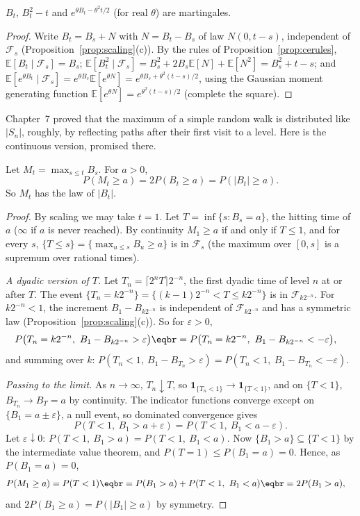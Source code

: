 \begin{proposition}\label{prop:bmmart}
$B_t$, $B_t^2-t$ and $e^{\theta B_t-\theta^2t/2}$ (for real $\theta$) are martingales.
\end{proposition}
\begin{proof}
Write $B_t=B_s+N$ with $N=B_t-B_s$ of law $N(0,t-s)$, independent of $\mathcal F_s$ (Proposition~\ref{prop:scaling}(c)). By the rules of Proposition~\ref{prop:cerules},
$\mathbb E[B_t\mid\mathcal F_s]=B_s$; $\mathbb E[B_t^2\mid\mathcal F_s]=B_s^2+2B_s\mathbb E[N]+\mathbb E[N^2]=B_s^2+t-s$; and $\mathbb E[e^{\theta B_t}\mid\mathcal F_s]=e^{\theta B_s}\mathbb E[e^{\theta N}]=e^{\theta B_s+\theta^2(t-s)/2}$, using the
Gaussian moment generating function $\mathbb E[e^{\theta N}]=e^{\theta^2(t-s)/2}$ (complete the square).
\end{proof}

Chapter~7 proved that the maximum of a simple random walk is distributed like $|S_n|$, roughly, by reflecting paths after
their first visit to a level. Here is the continuous version, promised there.

\begin{theorem}\label{thm:reflection}
Let $M_t=\max_{s\le t}B_s$. For $a>0$,
\[
P(M_t\ge a)=2P(B_t\ge a)=P(|B_t|\ge a).
\]
So $M_t$ has the law of $|B_t|$.
\end{theorem}
\begin{proof}
By scaling we may take $t=1$. Let $T=\inf\{s:B_s=a\}$, the hitting time of $a$ ($\infty$ if $a$ is never reached). By continuity $M_1\ge a$ if and only if
$T\le1$, and for every $s$, $\{T\le s\}=\{\max_{u\le s}B_u\ge a\}$ is in $\mathcal F_s$ (the maximum over $[0,s]$ is a supremum over rational times).

\emph{A dyadic version of $T$.} Let $T_n=\lceil2^nT\rceil2^{-n}$, the first dyadic time of level $n$ at or after $T$. The event $\{T_n=k2^{-n}\}=\{(k-1)2^{-n}<T\le k2^{-n}\}$ is in
$\mathcal F_{k2^{-n}}$. For $k2^{-n}<1$, the increment $B_1-B_{k2^{-n}}$ is independent of $\mathcal F_{k2^{-n}}$ and has a symmetric law (Proposition~\ref{prop:scaling}(c)). So for
$\varepsilon>0$,
\[
\begin{aligned}&P\bigl(T_n=k2^{-n},\ B_1-B_{k2^{-n}}>\varepsilon\bigr)\eqbr=P\bigl(T_n=k2^{-n},\ B_1-B_{k2^{-n}}<-\varepsilon\bigr),\end{aligned}
\]
and summing over $k$: $P(T_n<1,\ B_1-B_{T_n}>\varepsilon)=P(T_n<1,\ B_1-B_{T_n}<-\varepsilon)$.

\emph{Passing to the limit.} As $n\to\infty$, $T_n\downarrow T$, so $\mathbf 1_{\{T_n<1\}}\to\mathbf 1_{\{T<1\}}$, and on $\{T<1\}$, $B_{T_n}\to B_T=a$ by continuity. The indicator functions converge
except on $\{B_1=a\pm\varepsilon\}$, a null event, so dominated convergence gives
\[
P(T<1,\ B_1>a+\varepsilon)=P(T<1,\ B_1<a-\varepsilon).
\]
Let $\varepsilon\downarrow0$: $P(T<1,\ B_1>a)=P(T<1,\ B_1<a)$. Now $\{B_1>a\}\subseteq\{T<1\}$ by the intermediate value theorem, and $P(T=1)\le P(B_1=a)=0$. Hence, as $P(B_1=a)=0$,
\[
\begin{aligned}P(M_1\ge a)&=P(T<1)\eqbr=P(B_1>a)+P(T<1,\ B_1<a)\eqbr=2P(B_1>a),\end{aligned}
\]
and $2P(B_1\ge a)=P(|B_1|\ge a)$ by symmetry.
\end{proof}

